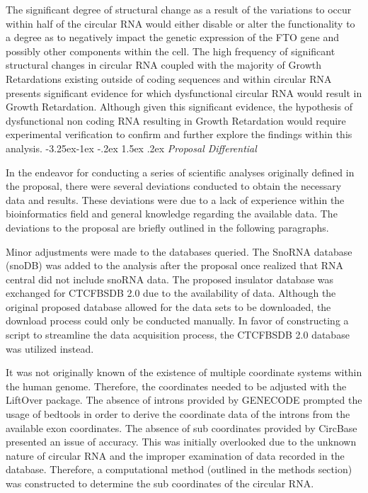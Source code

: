 \documentclass[11pt]{article}
\makeatletter
\renewcommand\subsection{\@startsection{subsection}{2}{\z@}%
                                         {-3.25ex\@plus -1ex \@minus -.2ex}%
                                         {1.5ex \@plus .2ex}%
                                         {\normalfont\fontfamily{phv}\fontsize{14}{17}\bfseries}}
\makeatother
\begin{document}
The significant degree of structural change as a result of the variations to occur within half of the circular RNA would either disable or alter the functionality to a degree as to negatively impact the genetic expression of the FTO gene and possibly other components within the cell. The high frequency of significant structural changes in circular RNA coupled with the majority of Growth Retardations existing outside of coding sequences and within circular RNA presents significant evidence for which dysfunctional circular RNA would result in Growth Retardation. Although given this significant evidence, the hypothesis of dysfunctional non coding RNA resulting in Growth Retardation would require experimental verification to confirm and further explore the findings within this analysis. 
\subsection{
\emph{Proposal Differential}} \label{s:prop differential}

In the endeavor for conducting a series of scientific analyses originally defined in the proposal, there were several deviations conducted to obtain the necessary data and results. These deviations were due to a lack of experience within the bioinformatics field and general knowledge regarding the available data. The deviations to the proposal are briefly outlined in the following paragraphs. 

Minor adjustments were made to the databases queried. The SnoRNA database (snoDB) was added to the analysis after the proposal once realized that RNA central did not include snoRNA data. The proposed insulator database was exchanged for CTCFBSDB 2.0 due to the availability of data. Although the original proposed database allowed for the data sets to be downloaded, the download process could only be conducted manually. In favor of constructing a script to streamline the data acquisition process, the CTCFBSDB 2.0 database was utilized instead. 

It was not originally known of the existence of multiple coordinate systems within the human genome. Therefore, the coordinates needed to be adjusted with the LiftOver package. The absence of introns provided by GENECODE prompted the usage of bedtools in order to derive the coordinate data of the introns from the available exon coordinates. The absence of sub coordinates provided by CircBase presented an issue of accuracy. This was initially overlooked due to the unknown nature of circular RNA and the improper examination of data recorded in the database. Therefore, a computational method (outlined in the methods section) was constructed to determine the sub coordinates of the circular RNA. 
\end{document}
